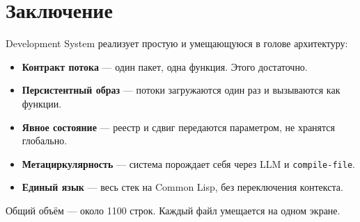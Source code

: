 \documentclass[11pt,a4paper]{article}
\begin{document}
\section{Заключение}

Development System реализует простую и умещающуюся в голове архитектуру:

\begin{itemize}[noitemsep]
  \item \textbf{Контракт потока} — один пакет, одна функция. Этого достаточно.
  \item \textbf{Персистентный образ} — потоки загружаются один раз и вызываются как функции.
  \item \textbf{Явное состояние} — реестр и сдвиг передаются параметром, не хранятся глобально.
  \item \textbf{Метациркулярность} — система порождает себя через LLM и \texttt{compile-file}.
  \item \textbf{Единый язык} — весь стек на Common Lisp, без переключения контекста.
\end{itemize}

Общий объём — около 1100 строк. Каждый файл умещается на одном экране.
\end{document}
